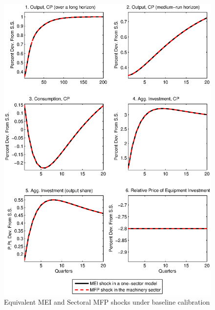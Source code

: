 \documentclass[12pt,fleqn]{article}
\begin{document}
\clearpage

\begin{figure}[tbp] \center
\caption{Equivalent MEI and Sectoral MFP shocks under baseline
calibration} \label{figure_a1}
\includegraphics[scale=0.9]{figure_a1.ps}
\end{figure}
\end{document}
